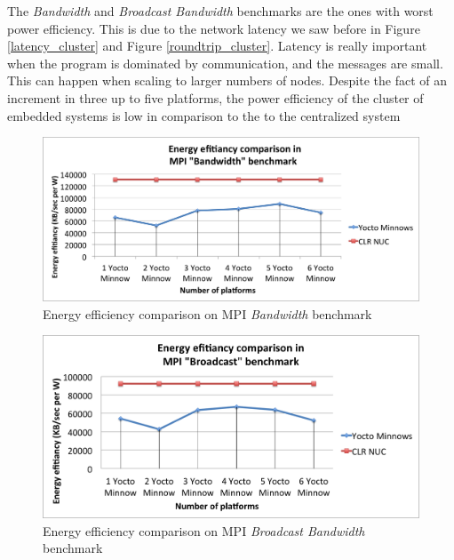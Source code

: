 The \textit{Bandwidth} and \textit{Broadcast Bandwidth} benchmarks are the ones
with worst power efficiency.  This is due to the network latency we saw before
in Figure \ref{latency_cluster} and Figure \ref{roundtrip_cluster}.  Latency is
really important when the program is dominated by communication, and the
messages are small.  This can happen when scaling to larger numbers of nodes.
Despite the fact of an increment in three up to five platforms, the power
efficiency of the cluster of embedded systems is low in comparison to the
to the centralized system \cite{NUC}

\begin{figure}[H]
\centering
\includegraphics[width=1 \textwidth]{images/energy_results/bandwidth.png}
\caption{Energy efficiency comparison on MPI \textit{Bandwidth} benchmark}
\label{bandwidth_energy}
\end{figure}


\begin{figure}[H]
\centering
\includegraphics[width=1 \textwidth]{images/energy_results/broadcast.png}
\caption{Energy efficiency comparison on MPI \textit{Broadcast Bandwidth} benchmark}
\label{broadcast_energy}
\end{figure}


\clearpage
